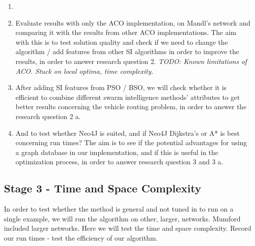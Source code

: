 \begin{enumerate}

\item 

\item Evaluate results with only the ACO implementation, on Mandl's network and comparing it with the results from other ACO implementations. The aim with this is to test solution quality and check if we need to change the algorithm / add features from other SI algorithms in order to improve the results, in order to answer research question 2. \emph{\color{red} TODO: Known limitations of ACO. Stuck on local optima, time complexity.}

\item After adding SI features from PSO / BSO, we will check whether it is efficient to combine different swarm intelligence methods' attributes to get better results concerning the vehicle routing problem, in order to answer the research question 2 a.

\item And to test whether Neo4J is suited, and if Neo4J Dijkstra's or A* is best concerning run times? The aim is to see if the potential advantages for using a graph database in our implementation, and if this is useful in the optimization process, in order to answer research question 3 and 3 a.

\end{enumerate}

\subsection{Stage 3 - Time and Space Complexity}

In order to test whether the method is general and not tuned in to run on a single example, we will run the algorithm on other, larger, networks. Mumford included larger networks. Here we will test the time and space complexity.
Record our run times - test the efficiency of our algorithm.


